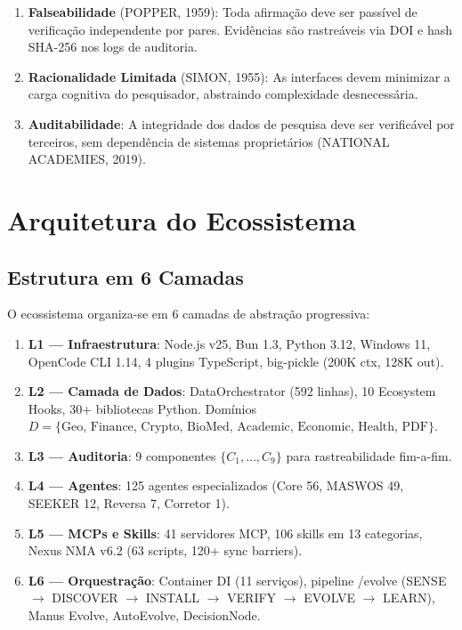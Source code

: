 \documentclass[12pt,a4paper]{article}
\begin{document}
\begin{enumerate}[itemsep=1pt]
  \item \textbf{Falseabilidade} (POPPER, 1959): Toda afirmação deve ser passível de verificação independente por pares. Evidências são rastreáveis via DOI e hash SHA-256 nos logs de auditoria.
  \item \textbf{Racionalidade Limitada} (SIMON, 1955): As interfaces devem minimizar a carga cognitiva do pesquisador, abstraindo complexidade desnecessária.
  \item \textbf{Auditabilidade}: A integridade dos dados de pesquisa deve ser verificável por terceiros, sem dependência de sistemas proprietários (NATIONAL ACADEMIES, 2019).
\end{enumerate}

\section{Arquitetura do Ecossistema}

\subsection{Estrutura em 6 Camadas}

O ecossistema organiza-se em 6 camadas de abstração progressiva:

\begin{enumerate}[itemsep=1pt]
  \item \textbf{L1 --- Infraestrutura}: Node.js v25, Bun 1.3, Python 3.12, Windows 11, OpenCode CLI 1.14, 4 plugins TypeScript, big-pickle (200K ctx, 128K out).
  \item \textbf{L2 --- Camada de Dados}: DataOrchestrator (592 linhas), 10 Ecosystem Hooks, 30+ bibliotecas Python. Domínios $D = \{\text{Geo, Finance, Crypto, BioMed, Academic, Economic, Health, PDF}\}$.
  \item \textbf{L3 --- Auditoria}: 9 componentes $\{C_1, \ldots, C_9\}$ para rastreabilidade fim-a-fim.
  \item \textbf{L4 --- Agentes}: 125 agentes especializados (Core 56, MASWOS 49, SEEKER 12, Reversa 7, Corretor 1).
  \item \textbf{L5 --- MCPs e Skills}: 41 servidores MCP, 106 skills em 13 categorias, Nexus NMA v6.2 (63 scripts, 120+ sync barriers).
  \item \textbf{L6 --- Orquestração}: Container DI (11 serviços), pipeline /evolve (SENSE $\rightarrow$ DISCOVER $\rightarrow$ INSTALL $\rightarrow$ VERIFY $\rightarrow$ EVOLVE $\rightarrow$ LEARN), Manus Evolve, AutoEvolve, DecisionNode.
\end{enumerate}
\end{document}
